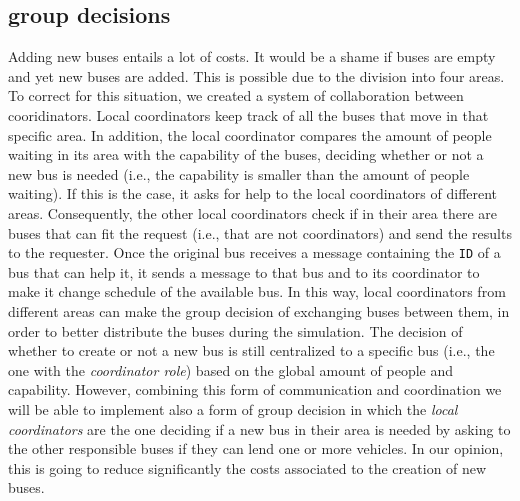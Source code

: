 \documentclass{article}
\begin{document}
\subsection{group decisions}
Adding new buses entails a lot of costs. It would be a shame if buses are empty and yet new buses are added. This is possible due to the division into four areas. To correct for this situation, we created a system of collaboration between cooridinators.
\newline
Local coordinators keep track of all the buses that move in that specific area. In addition, the local coordinator compares the amount of people waiting in its area with the capability of the buses, deciding whether or not a new bus is needed (i.e., the capability is smaller than the amount of people waiting). If this is the case, it asks for help to the local coordinators of different areas. Consequently, the other local coordinators check if in their area there are buses that can fit the request (i.e., that are not coordinators) and send the results to the requester. Once the original bus receives a message containing the \texttt{ID} of a bus that can help it, it sends a message to that bus and to its coordinator to make it change schedule of the available bus. In this way, local coordinators from different areas can make the group decision of exchanging buses between them, in order to better distribute the buses during the simulation.
\newline
The decision of whether to create or not a new bus is still centralized to a specific bus (i.e., the one with the \textit{coordinator role}) based on the global amount of people and capability. However, combining this form of communication and coordination we will be able to implement also a form of group decision in which the \textit{local coordinators} are the one deciding if a new bus in their area is needed by asking to the other responsible buses if they can lend one or more vehicles. In our opinion, this is going to reduce significantly the costs associated to the creation of new buses.
\end{document}
